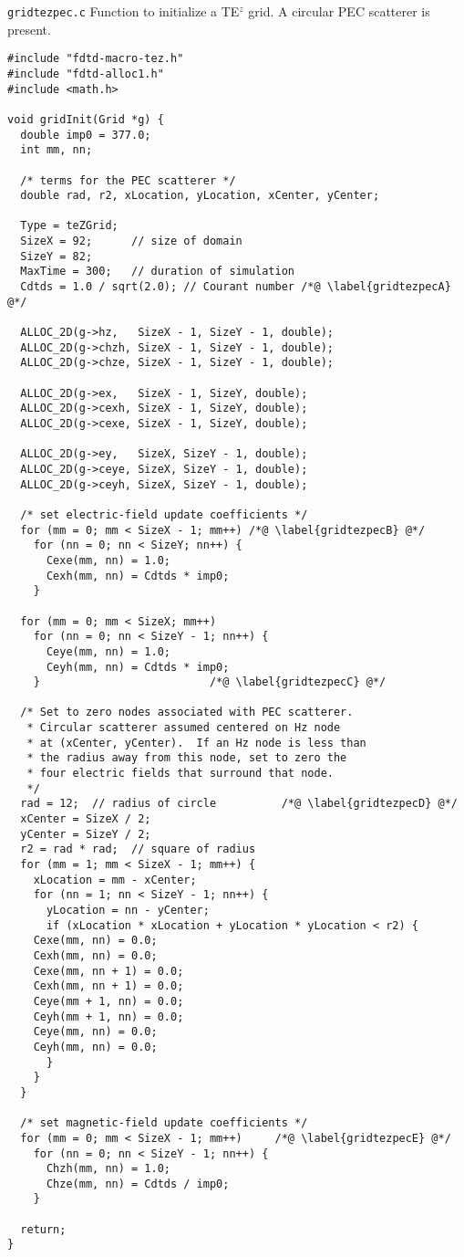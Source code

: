 \begin{program}
{\tt gridtezpec.c} Function to initialize a TE$^z$ grid.  A circular
PEC scatterer is present.
\label{pro:gridtezpec}
\codemiddle
\begin{lstlisting}
#include "fdtd-macro-tez.h"
#include "fdtd-alloc1.h"
#include <math.h>

void gridInit(Grid *g) {
  double imp0 = 377.0;
  int mm, nn;

  /* terms for the PEC scatterer */
  double rad, r2, xLocation, yLocation, xCenter, yCenter;

  Type = teZGrid;
  SizeX = 92;      // size of domain
  SizeY = 82;
  MaxTime = 300;   // duration of simulation
  Cdtds = 1.0 / sqrt(2.0); // Courant number /*@ \label{gridtezpecA} @*/

  ALLOC_2D(g->hz,   SizeX - 1, SizeY - 1, double);
  ALLOC_2D(g->chzh, SizeX - 1, SizeY - 1, double);
  ALLOC_2D(g->chze, SizeX - 1, SizeY - 1, double);

  ALLOC_2D(g->ex,   SizeX - 1, SizeY, double);
  ALLOC_2D(g->cexh, SizeX - 1, SizeY, double);
  ALLOC_2D(g->cexe, SizeX - 1, SizeY, double);

  ALLOC_2D(g->ey,   SizeX, SizeY - 1, double);
  ALLOC_2D(g->ceye, SizeX, SizeY - 1, double);
  ALLOC_2D(g->ceyh, SizeX, SizeY - 1, double);
  
  /* set electric-field update coefficients */
  for (mm = 0; mm < SizeX - 1; mm++) /*@ \label{gridtezpecB} @*/
    for (nn = 0; nn < SizeY; nn++) {
      Cexe(mm, nn) = 1.0;
      Cexh(mm, nn) = Cdtds * imp0;
    }

  for (mm = 0; mm < SizeX; mm++)
    for (nn = 0; nn < SizeY - 1; nn++) {
      Ceye(mm, nn) = 1.0;
      Ceyh(mm, nn) = Cdtds * imp0;
    }                          /*@ \label{gridtezpecC} @*/

  /* Set to zero nodes associated with PEC scatterer.
   * Circular scatterer assumed centered on Hz node
   * at (xCenter, yCenter).  If an Hz node is less than
   * the radius away from this node, set to zero the
   * four electric fields that surround that node. 
   */
  rad = 12;  // radius of circle          /*@ \label{gridtezpecD} @*/
  xCenter = SizeX / 2;
  yCenter = SizeY / 2;
  r2 = rad * rad;  // square of radius
  for (mm = 1; mm < SizeX - 1; mm++) {
    xLocation = mm - xCenter;
    for (nn = 1; nn < SizeY - 1; nn++) {
      yLocation = nn - yCenter;
      if (xLocation * xLocation + yLocation * yLocation < r2) {
	Cexe(mm, nn) = 0.0;
	Cexh(mm, nn) = 0.0;
	Cexe(mm, nn + 1) = 0.0;
	Cexh(mm, nn + 1) = 0.0;
	Ceye(mm + 1, nn) = 0.0;
	Ceyh(mm + 1, nn) = 0.0;
	Ceye(mm, nn) = 0.0;
	Ceyh(mm, nn) = 0.0;
      }
    }
  }

  /* set magnetic-field update coefficients */
  for (mm = 0; mm < SizeX - 1; mm++)     /*@ \label{gridtezpecE} @*/
    for (nn = 0; nn < SizeY - 1; nn++) {
      Chzh(mm, nn) = 1.0;
      Chze(mm, nn) = Cdtds / imp0;
    }

  return;
}
\end{lstlisting}
\end{program}

